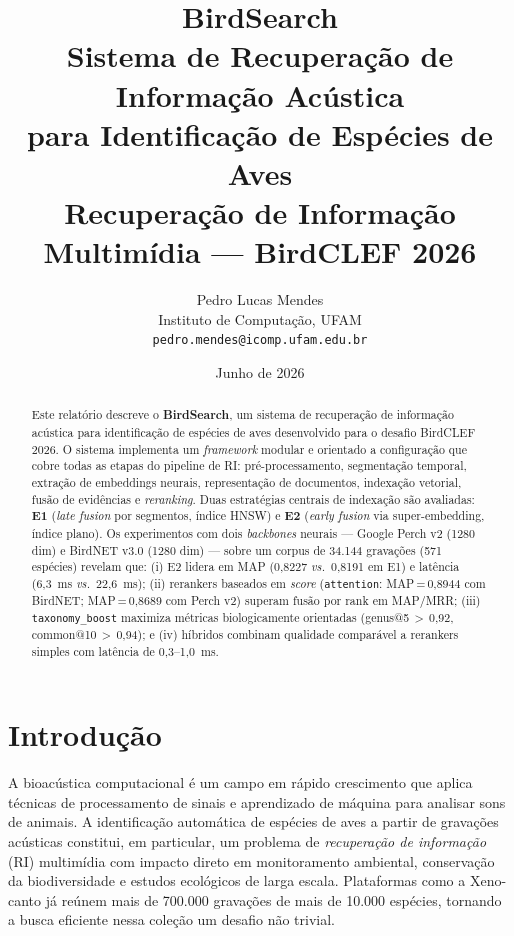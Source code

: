 \documentclass[12pt,a4paper]{article}
\title{%
  {\Large\bfseries BirdSearch}\\[0.5em]
  {\large Sistema de Recuperação de Informação Acústica\\
  para Identificação de Espécies de Aves}\\[1.5em]
  {\normalsize Recuperação de Informação Multimídia --- BirdCLEF 2026}
}
\author{%
  Pedro Lucas Mendes\\
  \small Instituto de Computação, UFAM\\
  \small \texttt{pedro.mendes@icomp.ufam.edu.br}
}
\date{Junho de 2026}
\begin{document}
\maketitle
\thispagestyle{empty}

\begin{abstract}
\noindent
Este relatório descreve o \textbf{BirdSearch}, um sistema de recuperação de
informação acústica para identificação de espécies de aves desenvolvido para
o desafio BirdCLEF 2026. O sistema implementa um \emph{framework} modular e
orientado a configuração que cobre todas as etapas do pipeline de RI:
pré-processamento, segmentação temporal, extração de embeddings neurais,
representação de documentos, indexação vetorial, fusão de evidências e
\emph{reranking}. Duas estratégias centrais de indexação são avaliadas:
\textbf{E1} (\emph{late fusion} por segmentos, índice HNSW) e \textbf{E2}
(\emph{early fusion} via super-embedding, índice plano). Os experimentos com
dois \emph{backbones} neurais --- Google Perch v2 (1280 dim) e BirdNET v3.0
(1280 dim) --- sobre um corpus de 34.144 gravações (571 espécies) revelam que:
(i) E2 lidera em MAP (0,8227 \emph{vs.}\ 0,8191 em E1) e latência (6,3~ms
\emph{vs.}\ 22,6~ms); (ii) rerankers baseados em \emph{score} (\texttt{attention}:
MAP\,=\,0,8944 com BirdNET; MAP\,=\,0,8689 com Perch v2) superam fusão por
rank em MAP/MRR; (iii) \texttt{taxonomy\_boost} maximiza métricas
biologicamente orientadas (genus@5\,$>$\,0,92, common@10\,$>$\,0,94); e (iv)
híbridos combinam qualidade comparável a rerankers simples com latência de
0,3--1,0~ms.
\end{abstract}

\tableofcontents
\newpage

\section{Introdução}
\label{sec:intro}

A bioacústica computacional é um campo em rápido crescimento que aplica técnicas
de processamento de sinais e aprendizado de máquina para analisar sons de
animais. A identificação automática de espécies de aves a partir de gravações
acústicas constitui, em particular, um problema de \emph{recuperação de
informação} (RI) multimídia com impacto direto em monitoramento ambiental,
conservação da biodiversidade e estudos ecológicos de larga escala. Plataformas
como a Xeno-canto já reúnem mais de 700.000 gravações de mais de 10.000 espécies,
tornando a busca eficiente nessa coleção um desafio não trivial.
\end{document}
